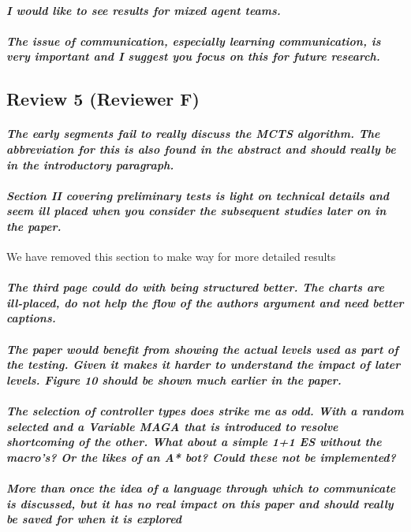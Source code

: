 \documentclass{article}
\begin{document}
\paragraph*{\textit{I would like to see results for mixed agent teams.}}
\paragraph*{\textit{The issue of communication, especially learning communication, is very important and I suggest you focus on this for future research.}}
\subsection{Review 5 (Reviewer F)}
\paragraph*{\textit{The early segments fail to really discuss the MCTS algorithm.  The abbreviation for this is also found in the abstract and should really be in the introductory paragraph.}}
\paragraph*{\textit{Section II covering preliminary tests is light on technical details and seem ill placed when you consider the subsequent studies later on in the paper.}}
We have removed this section to make way for more detailed results
\paragraph*{\textit{The third page could do with being structured better.  The charts are ill-placed, do not help the flow of the authors argument and need better captions.}}
\paragraph*{\textit{The paper would benefit from showing the actual levels used as part of the testing.  Given it makes it harder to understand the impact of later levels.  Figure 10 should be shown much earlier in the paper.}}
\paragraph*{\textit{The selection of controller types does strike me as odd.  With a random selected and a Variable MAGA that is introduced to resolve shortcoming of the other.  What about a simple 1+1 ES without the macro's?  Or the likes of an A* bot?  Could these not be implemented?}}
\paragraph*{\textit{More than once the idea of a language through which to communicate is discussed, but it has no real impact on this paper and should really be saved for when it is explored}}



\end{document}
